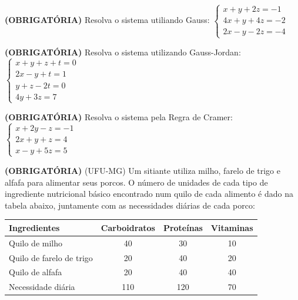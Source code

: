 \documentclass[pdftex, brazil, 12pt, oneside, addpoints]{exam}
\begin{document}
\begin{questions}
\question
\textbf{(OBRIGATÓRIA)} Resolva o sistema utiliando Gauss:
$\begin{cases}
  x + y + 2z = -1\\
  4x + y + 4z = -2\\
  2x - y - 2z = -4
\end{cases}$

\question
\textbf{(OBRIGATÓRIA)} Resolva o sistema utilizando Gauss-Jordan:
$\begin{cases}
  x + y + z + t = 0\\
  2x - y + t = 1\\
  y + z - 2t = 0\\
  4y + 3z = 7
\end{cases}$

\question
\textbf{(OBRIGATÓRIA)} Resolva o sistema pela Regra de Cramer:
$\begin{cases}
  x + 2y - z = -1\\
  2x + y + z = 4\\
  x - y + 5z = 5
\end{cases}$

\question
\textbf{(OBRIGATÓRIA)} (UFU-MG) Um sitiante utiliza milho, farelo de trigo e alfafa para
alimentar seus porcos. O número de unidades de cada tipo de ingrediente
nutricional básico encontrado num quilo de cada alimento é dado na
tabela abaixo, juntamente com as necessidades diárias de cada porco:

\begin{table}[h]
\centering
\begin{tabular}{@{}lccc@{}}
\toprule
\textbf{Ingredientes}    & \multicolumn{1}{l}{\textbf{Carboidratos}} & \multicolumn{1}{l}{\textbf{Proteínas}} & \multicolumn{1}{l}{\textbf{Vitaminas}} \\ \midrule
Quilo de milho           & 40                                        & 30                                     & 10                                     \\
Quilo de farelo de trigo & 20                                        & 40                                     & 20                                     \\
Quilo de alfafa          & 20                                        & 40                                     & 40                                     \\
Necessidade diária       & 110                                       & 120                                    & 70                                     \\ \bottomrule
\end{tabular}
\end{table}


\end{questions}
\end{document}
